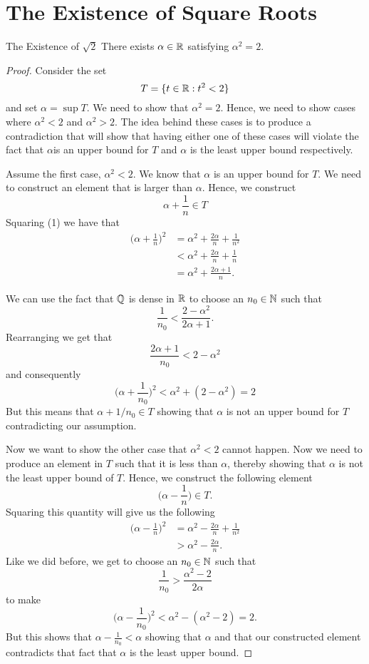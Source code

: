 \section{The Existence of Square Roots}
\begin{theorem}{The Existence of \( \sqrt{ 2 }  \)}{}
    There exists \( \alpha \in \mathbb{R}  \) satisfying \( \alpha^2 = 2 \).
\end{theorem}
\begin{proof}
    Consider the set 
    \[ T = \{ t \in \mathbb{R} : t^2 < 2 \} \]
    and set \( \alpha = \sup T \). We need to show that \( \alpha^2 = 2\). Hence, we need to show cases where \(  \alpha^2 < 2 \) and \( \alpha^2 > 2 \). The idea behind these cases is to produce a contradiction that will show that having either one of these cases will violate the fact that \( \alpha \)is an upper bound for \( T \) and \( \alpha\) is the least upper bound respectively. 

    Assume the first case, \( \alpha^2 < 2 \). We know that \( \alpha\) is an upper bound for \( T \). We need to construct an element that is larger than \( \alpha \). Hence, we construct 
    \[ \alpha + \frac{1}{n} \in T \tag{1}\]
    Squaring (1) we have that 
    \begin{align*}
        \bigg(\alpha + \frac{1}{n}\bigg)^2 &= \alpha^2 + \frac{2\alpha}{n} + \frac{1}{n^2} \\ 
                &< \alpha^2 + \frac{2\alpha}{n} + \frac{1}{n} \\
                &= \alpha^2 + \frac{2\alpha + 1}{n}.
    \end{align*}

    We can use the fact that \( \mathbb{Q} \) is dense in \( \mathbb{R} \) to choose an \( n_0 \in \mathbb{N} \) such that 
    \[ \frac{1}{n_0} < \frac{ 2 - \alpha^2}{2 \alpha + 1 }.\]
    Rearranging we get that 
    \[ \frac{2 \alpha + 1}{n_0} <  2 - \alpha^2 \] 
    and consequently 
    \[\bigg(\alpha + \frac{1}{n_0}\bigg)^2 < \alpha^2 + (2 - \alpha^2) = 2 \]
    But this means that \( \alpha + 1/n_0 \in T \) showing that \( \alpha \) is not an upper bound for \( T \) contradicting our assumption. 

    Now we want to show the other case that \( \alpha^2 < 2 \) cannot happen. Now we need to produce an element in \( T \) such that it is less than \( \alpha \), thereby showing that \( \alpha \) is not the least upper bound of \( T \). Hence, we construct the following element 
    \[ \bigg(\alpha - \frac{1}{n}\bigg)\in T. \]
    Squaring this quantity will give us the following
    \begin{align*}
        \bigg(\alpha - \frac{1}{n}\bigg)^2 &= \alpha^2 -\frac{2\alpha}{n} + \frac{1}{n^2} \\
        &> \alpha^2 - \frac{2 \alpha}{n}.
    \end{align*}
    Like we did before, we get to choose an \( n_0 \in \mathbb{N} \) such that 
    \[ \frac{1}{n_0} > \frac{\alpha^2 - 2}{2 \alpha} \]
    to make 
    \[\bigg(\alpha - \frac{1}{n_0}\bigg)^2 < \alpha^2 - (\alpha^2 - 2) = 2.\]
    But this shows that \( \alpha - \frac{1}{n_0} < \alpha \) showing that \( \alpha \) and that our constructed element contradicts that fact that \( \alpha\) is the least upper bound. 

\end{proof}



